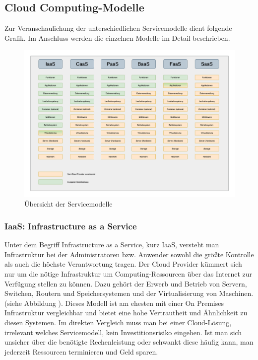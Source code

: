 \clearpage

\subsection{Cloud Computing-Modelle}
\label{Servicemodelle}
Zur Veranschaulichung der unterschiedlichen Servicemodelle dient folgende Grafik.
Im Anschluss werden die einzelnen Modelle im Detail beschrieben.


\begin{figure}[htbp]
    \centering
    \includegraphics[width=1.0\textwidth]{30-Serverless-Theorie/ServiceModelle.png}
    \caption{Übersicht der Servicemodelle}
    \label{fig:meine-grafik}
\end{figure}


   \subsubsection{IaaS: Infrastructure as a Service}
   Unter dem Begriff Infrastructure as a Service, kurz IaaS, versteht man Infrastruktur bei der Administratoren bzw. Anwender sowohl die größte Kontrolle als auch die höchste Verantwortung tragen.
   Der Cloud Provider kümmert sich nur um die nötige Infrastruktur um Computing-Ressourcen über das Internet zur Verfügung stellen zu können.
   Dazu gehört der Erwerb und Betrieb von Servern, Switchen, Routern und Speichersystemen und der Virtualisierung von Maschinen.(siehe Abbildung \textit{}).
   Dieses Modell ist am ehesten mit einer On Premises Infrastruktur vergleichbar und bietet eine hohe Vertrautheit und Ähnlichkeit zu diesen Systemen.
   Im direkten Vergleich muss man bei einer Cloud-Lösung, irrelevant welches Servicemodell, kein Investitionsrisiko eingehen.
   Ist man sich unsicher über die benötigte Rechenleistung oder schwankt diese häufig kann, man jederzeit Ressourcen terminieren und Geld sparen.

